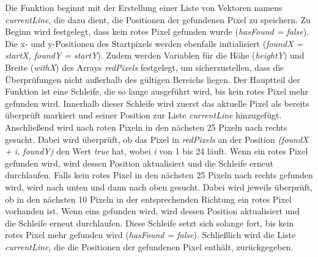 Die Funktion beginnt mit der Erstellung einer Liste von Vektoren namens \textit{currentLine}, die dazu dient, die Positionen der gefundenen Pixel zu speichern. Zu Beginn wird festgelegt, dass kein rotes Pixel gefunden wurde (\textit{hasFound = false}). Die x- und y-Positionen des Startpixels werden ebenfalls initialisiert (\textit{foundX = startX, foundY = startY}). Zudem werden Variablen für die Höhe (\textit{heightY}) und Breite (\textit{withX}) des Arrays \textit{redPixels} festgelegt, um sicherzustellen, dass die Überprüfungen nicht außerhalb des gültigen Bereichs liegen. Der Hauptteil der Funktion ist eine Schleife, die so lange ausgeführt wird, bis kein rotes Pixel mehr gefunden wird. Innerhalb dieser Schleife wird zuerst das aktuelle Pixel als bereits überprüft markiert und seiner Position zur Liste \textit{currentLine} hinzugefügt. Anschließend wird nach roten Pixeln in den nächsten 25 Pixeln nach rechts gesucht. Dabei wird überprüft, ob das Pixel in \textit{redPixels} an der Position \textit{(foundX + i, foundY)} den Wert \textit{true} hat, wobei \textit{i} von 1 bis 24 läuft. Wenn ein rotes Pixel gefunden wird, wird dessen Position aktualisiert und die Schleife erneut durchlaufen. Falls kein rotes Pixel in den nächsten 25 Pixeln nach rechts gefunden wird, wird nach unten und dann nach oben gesucht. Dabei wird jeweils überprüft, ob in den nächsten 10 Pixeln in der entsprechenden Richtung ein rotes Pixel vorhanden ist. Wenn eins gefunden wird, wird dessen Position aktualisiert und die Schleife erneut durchlaufen. Diese Schleife setzt sich solange fort, bis kein rotes Pixel mehr gefunden wird (\textit{hasFound = false}). Schließlich wird die Liste \textit{currentLine}, die die Positionen der gefundenen Pixel enthält, zurückgegeben.


